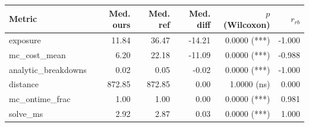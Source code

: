 \begin{tabular}{lrrrrr}
\toprule
Metric & Med. ours & Med. ref & Med. diff & $p$ (Wilcoxon) & $r_{rb}$ \\
\midrule
exposure & 11.84 & 36.47 & -14.21 & 0.0000 (***) & -1.000 \\
mc_cost_mean & 6.20 & 22.18 & -11.09 & 0.0000 (***) & -0.988 \\
analytic_breakdowns & 0.02 & 0.05 & -0.02 & 0.0000 (***) & -1.000 \\
distance & 872.85 & 872.85 & 0.00 & 1.0000 (ns) & 0.000 \\
mc_ontime_frac & 1.00 & 1.00 & 0.00 & 0.0000 (***) & 0.981 \\
solve_ms & 2.92 & 2.87 & 0.03 & 0.0000 (***) & 1.000 \\
\bottomrule
\end{tabular}
